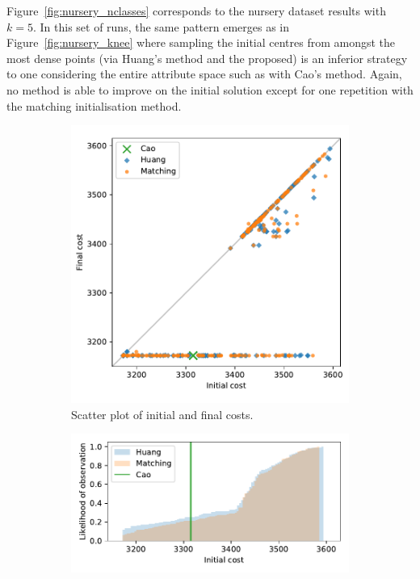 \documentclass[11pt]{article}
\begin{document}
Figure~\ref{fig:nursery_nclasses} corresponds to the nursery dataset results
with \(k=5\). In this set of runs, the same pattern emerges as in
Figure~\ref{fig:nursery_knee} where sampling the initial centres from amongst
the most dense points (via Huang's method and the proposed) is an inferior
strategy to one considering the entire attribute space such as with Cao's
method. Again, no method is able to improve on the initial solution except for
one repetition with the matching initialisation method.

\begin{figure}
    \begin{subfigure}{.5\textwidth}
        \includegraphics[width=\linewidth]{Fig5a.pdf}
        \caption{Scatter plot of initial and final costs.}
    \end{subfigure}
    \hfill%
    \begin{subfigure}{.5\textwidth}
        \includegraphics[width=\linewidth]{Fig5b1.pdf}


\end{subfigure}
\end{figure}
\end{document}
